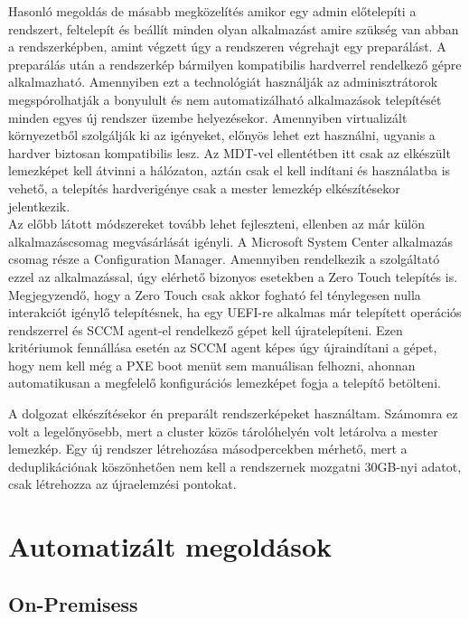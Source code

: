 \documentclass[12pt,oneside,justify,table]{book}
\begin{document}
Hasonló megoldás de másabb megközelítés amikor egy admin előtelepíti a rendszert, feltelepít és beállít minden olyan alkalmazást amire szükség van abban a rendszerképben, amint végzett úgy a rendszeren végrehajt egy preparálást. A preparálás után a rendszerkép bármilyen kompatibilis hardverrel rendelkező gépre alkalmazható. Amennyiben ezt a technológiát használják az adminisztrátorok megspórolhatják a bonyulult és nem automatizálható alkalmazások telepítését minden egyes új rendszer üzembe helyezésekor. Amennyiben virtualizált környezetből szolgálják ki az igényeket, előnyös lehet ezt használni, ugyanis a hardver biztosan kompatibilis lesz. Az MDT-vel ellentétben itt csak az elkészült lemezképet kell átvinni a hálózaton, aztán csak el kell indítani és használatba is vehető, a telepítés hardverigénye csak a mester lemezkép elkészítésekor jelentkezik. \\

Az előbb látott módszereket tovább lehet fejleszteni, ellenben az már külön alkalmazáscsomag megvásárlását igényli. A Microsoft System Center alkalmazás csomag része a Configuration Manager. Amennyiben rendelkezik a szolgáltató ezzel az alkalmazással, úgy elérhető bizonyos esetekben a Zero Touch telepítés is. Megjegyzendő, hogy a Zero Touch csak akkor fogható fel ténylegesen nulla interakciót igénylő telepítésnek, ha egy UEFI-re alkalmas már telepített operációs rendszerrel és SCCM agent-el rendelkező gépet kell újratelepíteni. Ezen kritériumok fennállása esetén az SCCM agent képes úgy újraindítani a gépet, hogy nem kell még a PXE boot menüt sem manuálisan felhozni, ahonnan automatikusan a megfelelő konfigurációs lemezképet fogja a telepítő betölteni. 

A dolgozat elkészítésekor én preparált rendszerképeket használtam. Számomra ez volt a legelőnyösebb, mert a cluster közös tárolóhelyén volt letárolva a mester lemezkép. Egy új rendszer létrehozása másodpercekben mérhető, mert a deduplikációnak köszönhetően nem kell a rendszernek mozgatni 30GB-nyi adatot, csak létrehozza az újraelemzési pontokat.  

\section{Automatizált megoldások}

\subsection{On-Premisess}
\end{document}
